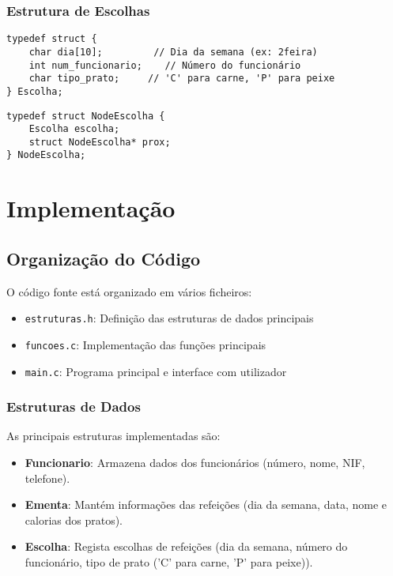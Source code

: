 \documentclass[a4paper,12pt]{report}
\begin{document}
\subsection{Estrutura de Escolhas}
\begin{lstlisting}[caption={Estrutura de dados para Escolhas},label=lst:escolha]
typedef struct {
    char dia[10];         // Dia da semana (ex: 2feira)
    int num_funcionario;    // Número do funcionário
    char tipo_prato;     // 'C' para carne, 'P' para peixe
} Escolha;
\end{lstlisting}
\begin{lstlisting}[caption={Estrutura do Nó da Lista de Escolhas},label=lst:noEscolha]
typedef struct NodeEscolha {
    Escolha escolha;
    struct NodeEscolha* prox;
} NodeEscolha;
\end{lstlisting}

\chapter{Implementação}

\section{Organização do Código}
O código fonte está organizado em vários ficheiros:
\begin{itemize}
    \item \texttt{estruturas.h}: Definição das estruturas de dados principais
    \item \texttt{funcoes.c}: Implementação das funções principais
    \item \texttt{main.c}: Programa principal e interface com utilizador
\end{itemize}

\subsection{Estruturas de Dados}
As principais estruturas implementadas são:
\begin{itemize}
    \item \textbf{Funcionario}: Armazena dados dos funcionários (número, nome, NIF, telefone).
    \item \textbf{Ementa}: Mantém informações das refeições (dia da semana, data, nome e calorias dos pratos).
    \item \textbf{Escolha}: Regista escolhas de refeições (dia da semana, número do funcionário, tipo de prato ('C' para carne, 'P' para peixe)).
\end{itemize}
\end{document}

